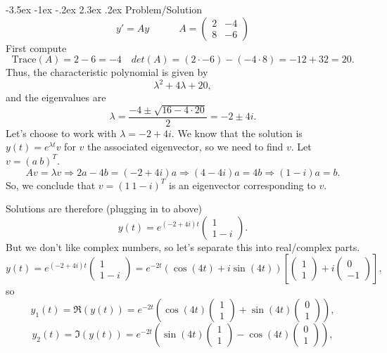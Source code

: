 \documentclass[11pt]{article}
\makeatletter
\renewcommand\section{\@startsection{section}{1}{\z@}%
                                  {-3.5ex \@plus -1ex \@minus -.2ex}%
                                  {2.3ex \@plus.2ex}%
                                  {\normalfont\large\bfseries}}
\makeatother
\begin{document}
\section{Problem/Solution}
\[ y' = A y \quad\quad\quad A = \left( \begin{matrix} 2 & -4 \\ 8 & -6 \end{matrix} \right) \]
First compute 
\[\mathrm{Trace}(A) = 2- 6 = -4 \quad det(A) = (2 \cdot -6) - (-4 \cdot8) = -12 +32 = 20 .\]
Thus, the characteristic polynomial is given by 
\[\lambda^2 +4 \lambda +20,\]
and the eigenvalues are 
\[ \lambda = \frac{-4 \pm \sqrt{16 - 4 \cdot 20}}{2} = -2 \pm 4 i.\]
Let's choose to work with $\lambda = -2 +4i$. We know that the solution is $y(t) = e^{\lambda t} v$ for $v$ the associated eigenvector, so we need to find $v$. Let $v = (a~b)^T$.
\[A v = \lambda v \Rightarrow 2 a - 4 b = (-2 +4 i) a \Rightarrow (4 -4 i ) a = 4 b \Rightarrow (1 - i) a = b.\]
So, we conclude that $v = (1~1-i)^T$ is an eigenvector corresponding to $v$.


Solutions are therefore (plugging in to above)
\[y(t)= e^{(-2 +4i)t}\left( \begin{matrix}1 \\ 1-i\end{matrix}\right).\]
But we don't like complex numbers, so let's separate this into real/complex parts.
\[y(t) =  e^{(-2 +4i)t}\left( \begin{matrix}1 \\ 1-i\end{matrix}\right) =e^{-2t} (\cos(4t) + i  \sin(4t)) \left[ \left( \begin{matrix}1 \\ 1\end{matrix}\right) + i \left( \begin{matrix}0 \\ -1\end{matrix}\right) \right], \]
so
\[y_1(t) = \Re (y (t)) = e^{-2t} \left(\cos(4t)   \left( \begin{matrix}1 \\ 1\end{matrix}\right) +   \sin(4t) \left( \begin{matrix}0 \\ 1\end{matrix}\right) \right), \]
\[y_2(t) = \Im (y (t)) = e^{-2t} \left(\sin(4t)   \left( \begin{matrix}1 \\ 1\end{matrix}\right) -   \cos(4t) \left( \begin{matrix}0 \\ 1\end{matrix}\right) \right), \]
\end{document}
